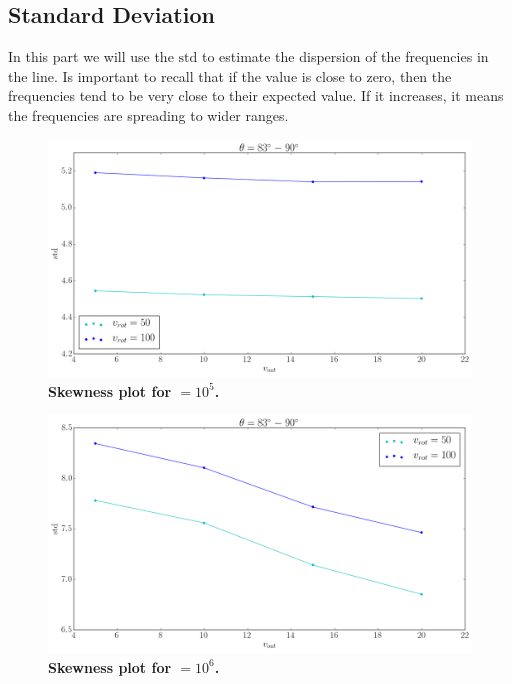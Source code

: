 \subsection{Standard Deviation}
In this part we will use the $\mathrm{std}$ to estimate the dispersion of the frequencies in the \lya line. Is important to recall that if the value is close to zero, then the frequencies tend to be very close to their expected value. If it increases, it means the frequencies are spreading to wider ranges. \\

\begin{figure}[h!]
	\begin{center}
		\includegraphics[width=1\textwidth]{./figures/chapter3/tau10E5_std_phi83-90}
	\end{center}
	\caption{\textbf{Skewness plot for \tauh$=10^5$.} 
		\label{fig:tau10E5_std_phi83-90}}
\end{figure}

\begin{figure}[h!]
	\begin{center}
		\includegraphics[width=1\textwidth]{./figures/chapter3/tau10E6_std_phi83-90}
	\end{center}
	\caption{\textbf{Skewness plot for \tauh$=10^6$.} 
		\label{fig:tau10E6_std_phi83-90}}
\end{figure}

